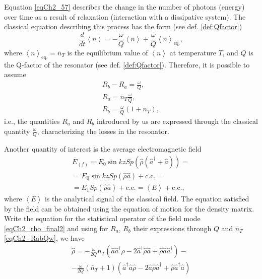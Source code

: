 Equation \eqref{eqCh2_57} describes the change in the number of photons (energy) over time as a result of relaxation (interaction with a dissipative system). The classical equation describing this process has the form (see def. \ref{def:Qfactor})
\begin{equation}
\frac{d}{d t}\left<n\right> = 
- \frac{\omega}{Q}\left<n\right> + \frac{\omega}{Q} \left<n\right>_{\mbox{eq.}},
\nonumber
\end{equation}
where $\left<n\right>_{\mbox{eq.}} = \bar{n}_T$ is the equilibrium value of $\left<n\right>$ at temperature $T$, and $Q$ is the Q-factor of the resonator (see def. \ref{def:Qfactor}).
Therefore, it is possible to assume 
\begin{eqnarray}
R_b - R_a = \frac{\omega}{Q},
\nonumber \\
R_a = \bar{n}_T \frac{\omega}{Q},
\nonumber \\
R_b = \frac{\omega}{Q} \left(1 + \bar{n}_T\right),
\label{eqCh2_RabQw}
\end{eqnarray}
i.e., the quantities $R_a$ and $R_b$ introduced by us are expressed through the classical quantity $\frac{\omega}{Q}$, characterizing the losses in the resonator. 

Another quantity of interest is the average electromagnetic field
\begin{eqnarray}
\bar{E}_{(f)} = E_0 \sin k z
Sp\left(\hat{\rho}\left(\hat{a}^{\dag} + \hat{a}\right)\right) = 
\nonumber \\
= E_0 \sin k z Sp\left(\hat{\rho}\hat{a}\right) + \text{c.c.} = 
\nonumber \\
= E_1 Sp\left(\hat{\rho}\hat{a}\right) + \text{c.c.} =
\left<E\right> + \text{c.c.}, 
\nonumber
\end{eqnarray}
where $\left<E\right>$ is the analytical signal of the classical field. The equation satisfied by the field can be obtained using the equation of motion for the density matrix. Write the equation for the statistical operator of the field mode \eqref{eqCh2_rho_final2} and using for $R_a$, $R_b$ their expressions through $Q$ and $\bar{n}_T$ \eqref{eqCh2_RabQw}, we have
\begin{eqnarray}
\dot{\hat{\rho}} =
- \frac{\omega}{2Q}\bar{n}_T
\left(\hat{a}\hat{a}^{\dag}\hat{\rho} - 
2 \hat{a}^{\dag}\hat{\rho}\hat{a} + \hat{\rho}\hat{a}\hat{a}^{\dag}
\right)
- 
\nonumber \\
- \frac{\omega}{2Q}\left(\bar{n}_T + 1\right)
\left(\hat{a}^{\dag}\hat{a}\hat{\rho} - 
2 \hat{a}\hat{\rho}\hat{a}^{\dag}
+ \hat{\rho}\hat{a}^{\dag}\hat{a}
\right)
\label{eqCh2_eq1_add1}
\end{eqnarray}

